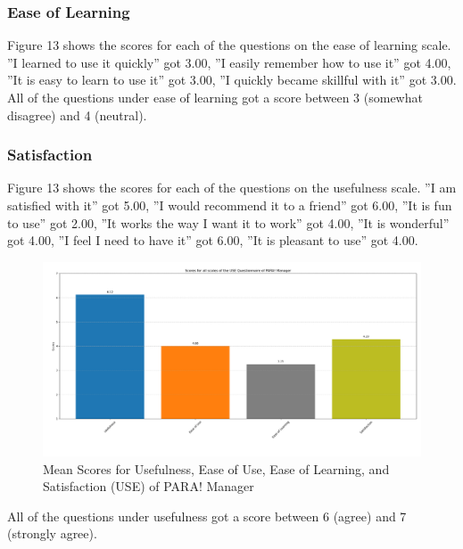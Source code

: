 \documentclass{icsthesis}
\begin{document}
\begin{mainmatter}
		\subsubsection{Ease of Learning}
		Figure 13 shows the scores for each of the questions on the ease of learning scale. ”I learned to use it quickly” got 3.00, ”I easily remember how to use it” got 4.00, ”It is easy to learn to use it” got 3.00, ”I quickly became skillful with it” got 3.00.
		All of the questions under ease of learning got a score between 3 (somewhat disagree) and 4 (neutral).
		\subsubsection{Satisfaction}
		Figure 13 shows the scores for each of the questions on the usefulness scale. ”I am satisfied with it” got 5.00, ”I would recommend it to a friend” got 6.00, ”It is fun to use” got 2.00, ”It works the way I want it to work” got 4.00, ”It is wonderful” got 4.00, ”I feel I need to have it” got 6.00, ”It is pleasant to use” got 4.00.
		
        \begin{figure}[h]
			\centering
				\includegraphics[scale=0.18]{./figures/manager means total.png}
			\caption{Mean Scores for Usefulness, Ease of Use, Ease of Learning, and Satisfaction (USE) of PARA! Manager}
		\end{figure}
		
        All of the questions under usefulness got a score between 6 (agree) and 7 (strongly agree).

\end{mainmatter}
\end{document}
